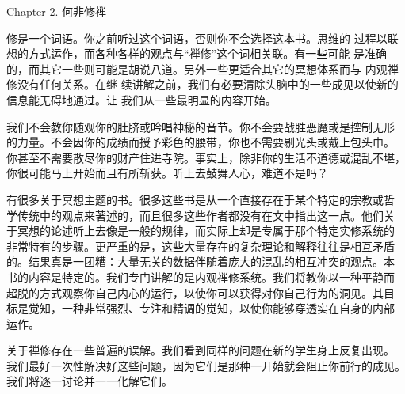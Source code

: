 


\beginchapter Chapter 2. 何非修禅


{
\parindent=3pc
\noindent\hang{}
\1%
{修是一个词语}。你之前听过这个词语，否则你不会选择这本书。思维的
过程以联想的方式运作，而各种各样的观点与“禅修”这个词相关联。有一些可能
是准确的，而其它一些则可能是胡说八道。另外一些更适合其它的冥想体系而与
内观禅修没有任何关系。在继
续讲解之前，我们有必要清除头脑中的一些成见以使新的信息能无碍地通过。让
我们从一些最明显的内容开始。

}

我们不会教你随观你的肚脐或吟唱神秘的音节。你不会要战胜恶魔或是控制无形
的力量。不会因你的成绩而授予彩色的腰带，你也不需要剔光头或戴上包头巾。
你甚至不需要散尽你的财产住进寺院。事实上，除非你的生活不道德或混乱不堪，
你很可能马上开始而且有所斩获。听上去鼓舞人心，难道不是吗？

有很多关于冥想主题的书。很多这些书是从一个直接存在于某个特定的宗教或哲
学传统中的观点来著述的，而且很多这些作者都没有在文中指出这一点。他们关
于冥想的论述听上去像是一般的规律，而实际上却是专属于那个特定实修系统的
非常\1特有的步骤。更严重的是，这些大量存在的复杂理论和解释往往是相互矛盾
的。结果真是一团糟：大量无关的数据伴随着庞大的混乱的相互冲突的观点。本
书的内容是特定的。我们专门讲解的是内观禅修系统。我们将教你以一种平静而
超脱的方式观察你自己内心的运行，以使你可以获得对你自己行为的洞见。其目
标是觉知，一种非常强烈、专注和精调的觉知，以使你能够穿透实在自身的内部
运作。

关于禅修存在一些普遍的误解。我们看到同样的问题在新的学生身上反复出现。
我们最好一次性解决好这些问题，因为它们是那种一开始就会阻止你前行的成见。
我们将逐一讨论并一一化解它们。

\endchapter

\vfill\eject\byebye
